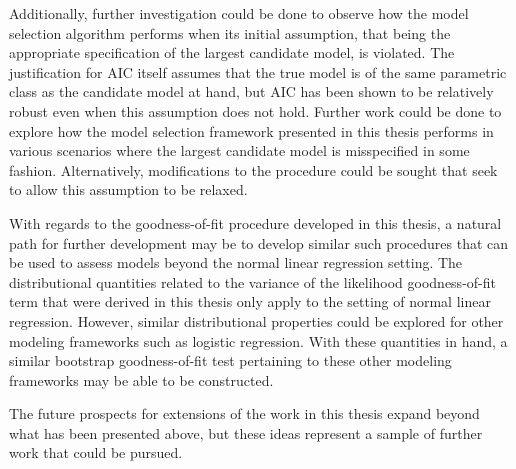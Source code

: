 		Additionally, further investigation could be done to observe how the model selection algorithm performs when its initial assumption, that being the appropriate
		specification of the largest candidate model, is violated. The justification for AIC itself assumes that the true model is of the same parametric class as the candidate model
		at hand, but AIC has been shown to be relatively robust even when this assumption does not hold. Further work could be done to explore how the model selection
		framework presented in this thesis performs in various scenarios where the largest candidate model is misspecified in some fashion. Alternatively, modifications
		to the procedure could be sought that seek to allow this assumption to be relaxed.

		With regards to the goodness-of-fit procedure developed in this thesis, a natural path for further development may be to develop similar such procedures that can
		be used to assess models beyond the normal linear regression setting. The distributional quantities related to the variance of the likelihood goodness-of-fit term that were derived
		in this thesis only apply to the setting of normal linear regression. However, similar distributional properties could be explored for other modeling frameworks such
		as logistic regression. With these quantities in hand, a similar bootstrap goodness-of-fit test pertaining to these other modeling frameworks may be able to be constructed.
		
		The future prospects for extensions of the work in this thesis expand beyond what has been presented above, but these ideas represent a sample of further work that
		could be pursued.
		
		
		